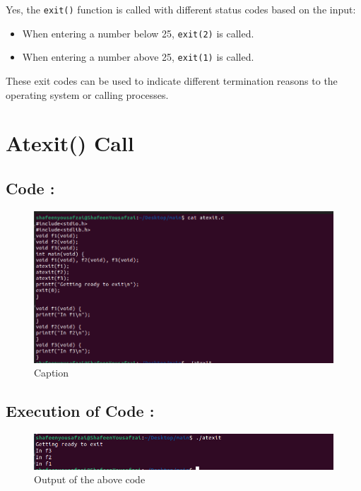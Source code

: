 \documentclass[12pt]{article}
\begin{document}
Yes, the \texttt{exit()} function is called with different status codes based on the input:

\begin{itemize}
    \item When entering a number below 25, \texttt{exit(2)} is called.
    \item When entering a number above 25, \texttt{exit(1)} is called.
\end{itemize}

These exit codes can be used to indicate different termination reasons to the operating system or calling processes.

\section{Atexit() Call}

\subsection{Code : }
\begin{figure}[H]
    \centering
    \includegraphics[width=\textwidth]{2.png}
    \caption{Caption}
    \label{fig:enter-label}
\end{figure}

\subsection{Execution of Code : }
\begin{figure}[H]
    \centering
    \includegraphics[width=\textwidth]{3.png}
    \caption{Output of the above code}
    \label{fig:enter-label}
\end{figure}
\end{document}
